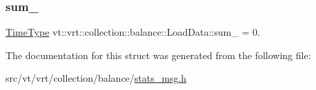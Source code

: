 \subsubsection{\texorpdfstring{sum\+\_\+}{sum\_}}
{\footnotesize\ttfamily \hyperlink{namespacevt_a876a9d0cd5a952859c72de8a46881442}{Time\+Type} vt\+::vrt\+::collection\+::balance\+::\+Load\+Data\+::sum\+\_\+ = 0.}



The documentation for this struct was generated from the following file\+:\begin{DoxyCompactItemize}
\item 
src/vt/vrt/collection/balance/\hyperlink{stats__msg_8h}{stats\+\_\+msg.\+h}\end{DoxyCompactItemize}
